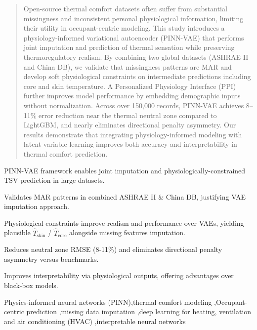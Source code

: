 \documentclass[preprint,12pt]{elsarticle}
\begin{document}
\begin{frontmatter}
\begin{abstract}
Open-source thermal comfort datasets often suffer from substantial missingness and inconsistent personal physiological information, limiting their utility in occupant-centric modeling. This study introduces a physiology-informed variational autoencoder (PINN-VAE) that performs joint imputation and prediction of thermal sensation while preserving thermoregulatory realism. By combining two global datasets (ASHRAE II and China DB), we validate that missingness patterns are MAR and develop soft physiological constraints on intermediate predictions including core and skin temperature. A Personalized Physiology Interface (PPI) further improves model performance by embedding demographic inputs without normalization. Across over 150,000 records, PINN-VAE achieves 8–11\% error reduction near the thermal neutral zone compared to LightGBM, and nearly eliminates directional penalty asymmetry. Our results demonstrate that integrating physiology-informed modeling with latent-variable learning improves both accuracy and interpretability in thermal comfort prediction.
\end{abstract}


\begin{graphicalabstract}
\end{graphicalabstract}

\begin{highlights} %
    \item PINN-VAE framework enables joint imputation and physiologically-constrained TSV prediction in large datasets. 
    \item Validates MAR patterns in combined ASHRAE II \& China DB, justifying VAE imputation approach. 
    \item Physiological constraints improve realism and performance over VAEs, yielding plausible $\hat{T}_{\text{skin}}$ / $\hat{T}_{\text{core}}$ alongside missing features imputation. 
    \item Reduces neutral zone RMSE (8-11\%) and eliminates directional penalty asymmetry versus benchmarks. %
    \item Improves interpretability via physiological outputs, offering advantages over black-box models. 
\end{highlights}

\begin{keyword}
Physics-informed neural networks (PINN)\sep thermal comfort modeling \sep Occupant-centric prediction \sep missing data imputation \sep deep learning for heating, ventilation and air conditioning (HVAC) \sep interpretable neural networks
\end{keyword}

\end{frontmatter}
\end{document}
